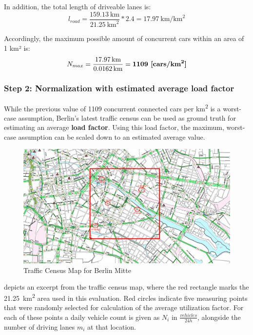 In addition, the total length of driveable lanes is:
$$l_{road} = \frac{\SI{159.13}{\km}}{\SI{21.25}{\square\km}} * 2.4 = \SI{17.97}{\km\per\square\km}$$

Accordingly, the maximum possible amount of concurrent cars within an area of 1 km² is:
$$N_{max} = \frac{\SI{17.97}{\km}}{\SI{0.0162}{\km}} = \textbf{1109 [\si[detect-weight]{cars\per\square\km}]}$$

\subsubsection{Step 2: Normalization with estimated average load factor}
While the previous value of 1109 concurrent connected cars per \si{\square\kilo\meter} is a worst-case assumption, Berlin's latest traffic census \cite{VerkehrslenkungBerlinVLB2014} can be used as ground truth for estimating an average \textbf{load factor}. Using this load factor, the maximum, worst-case assumption can be scaled down to an estimated average value. 

\begin{figure}[H]
	\centering
	\includegraphics[width=1.0\linewidth]{98_images/berlin_traffic_map_2}
	\caption[Traffic Census Map for Berlin Mitte]{Traffic Census Map for Berlin Mitte \cite{VerkehrslenkungBerlinVLB2014}}
	\label{fig:berlin_traffic_map}
\end{figure}

 depicts an excerpt from the traffic census map, where the red rectangle marks the \SI{21.25}{\square\km} area used in this evaluation. Red circles indicate five measuring points that were randomly selected for calculation of the average utilization factor. For each of these points a daily vehicle count is given as $N_{i}$ in $\frac{vehicles}{24 h}$, alongside the number of driving lanes $m_i$ at that location.

